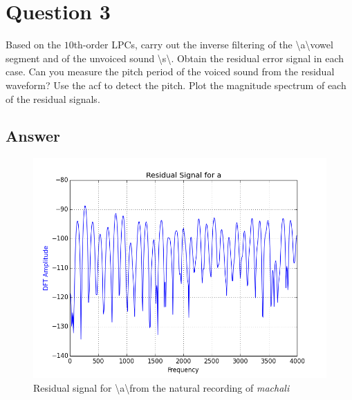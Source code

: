 \documentclass[a4paper]{article}
\begin{document}
\newpage
\section{Question 3}
Based on the $10$th-order LPCs, carry out the inverse filtering of the  \textbackslash a\textbackslash vowel segment and of the unvoiced sound  \textbackslash s\textbackslash. Obtain the residual error signal in each case. Can you measure the pitch period of the voiced sound from the residual waveform? Use the acf to detect the pitch. Plot the magnitude spectrum of each of the residual signals. 

\subsection{Answer}


\textbf{}

\begin{figure}[h!]
    \includegraphics[width=\linewidth]{./images/res_signal_a.png}
    \caption{Residual signal  for \textbackslash a\textbackslash from the natural recording of \textit{machali}}
    \label{fig:1}
\end{figure}
\end{document}
